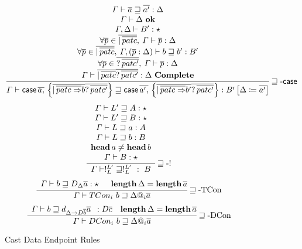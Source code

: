 \begin{figure}
\[
\frac{\begin{array}{c}
\varGamma\vdash\overline{a}\sqsupseteq\overline{a'}:\Delta\\
\varGamma\vdash\Delta\ \mathbf{ok}\\
\varGamma,\Delta\vdash B':\star\\
\forall\overline{p}\in\overline{|\,\overline{patc}},\:\varGamma\vdash\overline{p}:\Delta\\
\forall\overline{p}\in\overline{|\,\overline{patc}},\:\varGamma,\left(\overline{p}:\Delta\right)\vdash b\sqsupseteq b':B'\\
\forall\overline{p}\in\overline{?\,\overline{patc'}},\:\varGamma\vdash\overline{p}:\Delta\\
\varGamma\vdash\overline{|\,\overline{patc}}\overline{?\,\overline{patc'}}:\Delta\ \mathbf{Complete}
\end{array}}{
  \varGamma\vdash\mathsf{case}\,\overline{a,}\,\left\{ \overline{|\,\overline{patc\Rightarrow}b} \overline{?\,\overline{patc'}} \right\} \sqsupseteq\mathsf{case}\,\overline{a',}\,\left\{ \overline{|\,\overline{patc\Rightarrow}b'} \overline{?\,\overline{patc'}} \right\} :B'\left[\Delta\coloneqq\overline{a'}\right]
  }\rulename{\sqsupseteq-\mathsf{case}}
\]
\[
\frac{\begin{array}{c}
\varGamma\vdash L'\sqsupseteq A:\star\\
\varGamma\vdash L'\sqsupseteq B:\star\\
\varGamma\vdash L\sqsupseteq a:A\\
\varGamma\vdash L\sqsupseteq b:B\\
\mathbf{head}\,a\neq\mathbf{head}\,b\\
\varGamma\vdash B:\star
\end{array}}{\varGamma\vdash!_{L}^{L'}\sqsupseteq!_{L}^{L'}\ :\ B}\rulename{\sqsupseteq-!}
\]
\[
\frac{\begin{array}{c}
\varGamma\vdash b\sqsupseteq D_{\Delta}\overline{a}:\star\end{array}\quad\mathbf{length}\,\Delta=\mathbf{length}\,\overline{a}}{\varGamma\vdash TCon_{i}\ b\sqsupseteq\Delta@_{i}\overline{a}
}\rulename{\sqsupseteq-TCon}
\]
\[
\frac{\begin{array}{c}
\varGamma\vdash b\sqsupseteq d_{\Delta\rightarrow D\overline{b}}\overline{a}\end{array}:D\overline{c}\quad\mathbf{length}\,\Delta=\mathbf{length}\,\overline{a}}{\varGamma\vdash DCon_{i}\ b\sqsupseteq\Delta@_{i}\overline{a}
}\rulename{\sqsupseteq-DCon}
\]
  
\caption{Cast Data Endpoint Rules}
\label{fig:cast-Data-Endpoint-Rules}
\end{figure}


